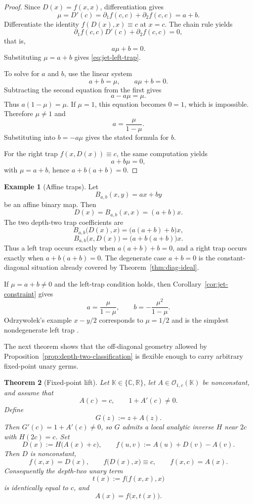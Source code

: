 \documentclass[11pt]{amsart}
\numberwithin{equation}{section}
\newtheorem{theorem}{Theorem}[section]
\theoremstyle{remark}
\theoremstyle{definition}
\newtheorem{example}[theorem]{Example}
\newcommand{\C}{\mathbb{C}}
\newcommand{\R}{\mathbb{R}}
\newcommand{\K}{\mathbb{K}}
\newcommand{\Oc}{\mathcal{O}}
\begin{document}
\begin{proof}
Since $D(x)=f(x,x)$, differentiation gives
\[
\mu=D'(c)=\partial_1 f(c,c)+\partial_2 f(c,c)=a+b.
\]
Differentiate the identity $f(D(x),x)\equiv c$ at $x=c$. The chain rule yields
\[
\partial_1 f(c,c)D'(c)+\partial_2 f(c,c)=0,
\]
that is,
\[
a\mu+b=0.
\]
Substituting $\mu=a+b$ gives \eqref{eq:jet-left-trap}.

To solve for $a$ and $b$, use the linear system
\[
a+b=\mu,\qquad a\mu+b=0.
\]
Subtracting the second equation from the first gives
\[
a-a\mu=\mu.
\]
Thus $a(1-\mu)=\mu$. If $\mu=1$, this equation becomes $0=1$, which is impossible. Therefore $\mu\neq 1$ and
\[
a=\frac{\mu}{1-\mu}.
\]
Substituting into $b=-a\mu$ gives the stated formula for $b$.

For the right trap $f(x,D(x))\equiv c$, the same computation yields
\[
a+b\mu=0,
\]
with $\mu=a+b$, hence $a+b(a+b)=0$.
\end{proof}

\begin{example}[Affine traps]\label{ex:affine-traps}
Let
\[
B_{a,b}(x,y)=ax+by
\]
be an affine binary map. Then
\[
D(x)=B_{a,b}(x,x)=(a+b)x.
\]
The two depth-two trap coefficients are
\[
B_{a,b}\bigl(D(x),x\bigr)=\bigl(a(a+b)+b\bigr)x,
\]
\[
B_{a,b}\bigl(x,D(x)\bigr)=\bigl(a+b(a+b)\bigr)x.
\]
Thus a left trap occurs exactly when $a(a+b)+b=0$, and a right trap occurs exactly when $a+b(a+b)=0$. The degenerate case $a+b=0$ is the constant-diagonal situation already covered by Theorem~\ref{thm:diag-ideal}.

If $\mu=a+b\neq 0$ and the left-trap condition holds, then Corollary~\ref{cor:jet-constraint} gives
\[
a=\frac{\mu}{1-\mu},\qquad b=-\frac{\mu^2}{1-\mu}.
\]
Odrzywo{\l}ek's example $x-y/2$ corresponds to $\mu=1/2$ and is the simplest nondegenerate left trap \cite{Odrzywolek2026}.
\end{example}

The next theorem shows that the off-diagonal geometry allowed by Proposition~\ref{prop:depth-two-classification} is flexible enough to carry arbitrary fixed-point unary germs.

\begin{theorem}[Fixed-point lift]\label{thm:fixed-point-lift}
Let $\K\in\{\C,\R\}$, let $A\in \Oc_{1,c}(\K)$ be nonconstant, and assume that
\[
A(c)=c,\qquad 1+A'(c)\neq 0.
\]
Define
\[
G(z):=z+A(z).
\]
Then $G'(c)=1+A'(c)\neq 0$, so $G$ admits a local analytic inverse $H$ near $2c$ with $H(2c)=c$. Set
\begin{equation}\label{eq:fixed-point-lift-def}
D(x):=H\bigl(A(x)+c\bigr),\qquad f(u,v):=A(u)+D(v)-A(v).
\end{equation}
Then $D$ is nonconstant,
\[
f(x,x)=D(x),\qquad f\bigl(D(x),x\bigr)\equiv c,\qquad f(x,c)=A(x).
\]
Consequently the depth-two unary term
\[
t(x):=f\bigl(f(x,x),x\bigr)
\]
is identically equal to $c$, and
\[
A(x)=f\bigl(x,t(x)\bigr).
\]
\end{theorem}
\end{document}
